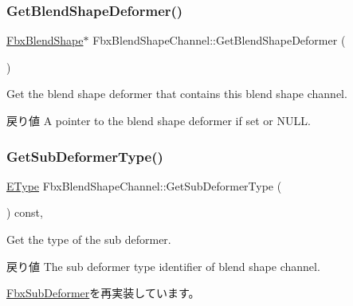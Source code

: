\mbox{\label{class_fbx_blend_shape_channel_aa79b43cdb62a8dc5bbafad03acbf4425}} 
\subsubsection{\texorpdfstring{Get\+Blend\+Shape\+Deformer()}{GetBlendShapeDeformer()}}
{\footnotesize\ttfamily \hyperlink{class_fbx_blend_shape}{Fbx\+Blend\+Shape}$\ast$ Fbx\+Blend\+Shape\+Channel\+::\+Get\+Blend\+Shape\+Deformer (\begin{DoxyParamCaption}{ }\end{DoxyParamCaption})}

Get the blend shape deformer that contains this blend shape channel. \begin{DoxyReturn}{戻り値}
A pointer to the blend shape deformer if set or N\+U\+LL. 
\end{DoxyReturn}
\mbox{\label{class_fbx_blend_shape_channel_a1dba13e481ea7ba1874587ad92ee0347}} 
\subsubsection{\texorpdfstring{Get\+Sub\+Deformer\+Type()}{GetSubDeformerType()}}
{\footnotesize\ttfamily \hyperlink{class_fbx_sub_deformer_aed7eba8aabbb8b25a8ddbab127d67319}{E\+Type} Fbx\+Blend\+Shape\+Channel\+::\+Get\+Sub\+Deformer\+Type (\begin{DoxyParamCaption}{ }\end{DoxyParamCaption}) const\hspace{0.3cm}{\ttfamily [inline]}, {\ttfamily [virtual]}}

Get the type of the sub deformer. \begin{DoxyReturn}{戻り値}
The sub deformer type identifier of blend shape channel. 
\end{DoxyReturn}


\hyperlink{class_fbx_sub_deformer_a1a1998b98ca03598bc6bec630e1aaa97}{Fbx\+Sub\+Deformer}を再実装しています。



